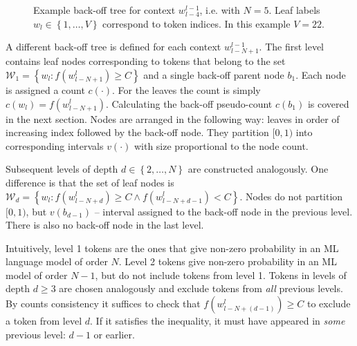 \documentclass{IIBproject}
\makeatletter
\newcommand*{\ie}{i.e.\@\xspace}
\makeatother
\begin{document}
\begin{figure}[h]
\caption{\label{fig:backoff_tree}Example back-off tree for context $w_{l-4}^{l-1}$, \ie with $N=5$. Leaf labels $w_l \in \left\{ 1, \dots, V \right\}$ correspond to token indices. In this example $V=22$.}
\end{figure}

A different back-off tree is defined for each context $w_{l-N+1}^{l-1}$. The first level contains leaf nodes corresponding to tokens that belong to the set $\mathcal W_1 = \left\{ w_l : f(w_{l-N+1}^l) \ge C \right\}$ and a single back-off parent node $b_1$. Each node is assigned a count $c(\cdot)$. For the leaves the count is simply $c(w_l) = f(w_{l-N+1}^l)$. Calculating the back-off pseudo-count $c(b_1)$ is covered in the next section. Nodes are arranged in the following way: leaves in order of increasing index followed by the back-off node. They partition $[0,1)$ into corresponding intervals $v(\cdot)$ with size proportional to the node count.

Subsequent levels of depth $d \in \left\{ 2, \dots, N \right\}$ are constructed analogously. One difference is that the set of leaf nodes is $\mathcal W_d = \left\{ w_l : f(w_{l-N+d}^l) \ge C \land f(w_{l-N+d-1}^l) < C \right\}$. Nodes do not partition $[0,1)$, but $v(b_{d-1})$ -- interval assigned to the back-off node in the previous level. There is also no back-off node in the last level.

Intuitively, level 1 tokens are the ones that give non-zero probability in an ML language model of order $N$. Level 2 tokens give non-zero probability in an ML model of order $N-1$, but do not include tokens from level 1. Tokens in levels of depth $d \ge 3$ are chosen analogously and exclude tokens from \emph{all} previous levels. By counts consistency it suffices to check that $f(w_{l-N+(d-1)}^l) \ge C$ to exclude a token from level $d$. If it satisfies the inequality, it must have appeared in \emph{some} previous level: $d-1$ or earlier.
\end{document}
